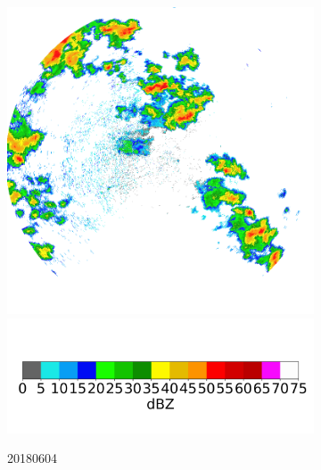 \begin{figure}[ht]
	\centering
	\begin{subfigure}[b]{0.45\textwidth}
		\includegraphics[width=\textwidth]{./thesis_code/plots/midlothian-tx-20180604-115830-ref.png}
		\includegraphics[width=\textwidth]{./thesis_code/plots/dfw_colormap.png}
		\caption{20180604}
		\label{fig:classifying_datadiscovery_ex1}
	\end{subfigure}
	\begin{subfigure}[b]{0.45\textwidth}

\end{subfigure}
\end{figure}
